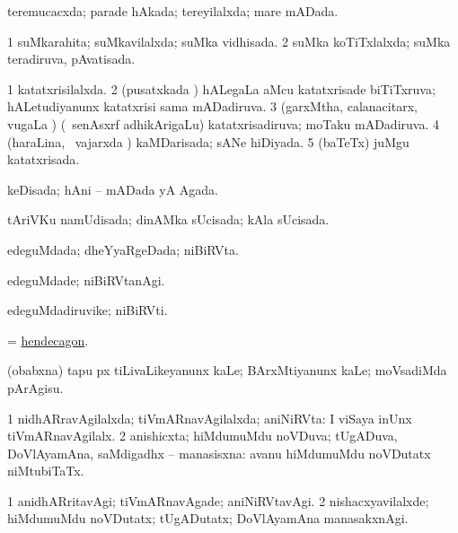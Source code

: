 \bentry
{} 
\gl{\gu}
\expl{}
\bmng
 teremucacxda; parade hAkada; tereyilalxda; mare mADada. 
\emng
\eentry

\bentry
{} 
\gl{\gu}
\expl{}
\bmng
\bnum
\num{1} suMkarahita; suMkavilalxda; suMka vidhisada. 
\num{2} suMka koTiTxlalxda; suMka teradiruva, pAvatisada. 
\enum
\emng
\eentry

\bentry
{} 
\gl{\gu}
\expl{}
\bmng
\bnum
\num{1} katatxrisilalxda. 
\num{2} (pusatxkada \vi) hALegaLa aMcu katatxrisade biTiTxruva; hALetudiyanunx katatxrisi sama mADadiruva. 
\num{3} (garxMtha, calanacitarx, \mo vugaLa \vi) (\kanmu\ senAsxrf adhikArigaLu) katatxrisadiruva; moTaku mADadiruva. 
\num{4} (haraLina, \kanmu\ vajarxda \vi) kaMDarisada; sANe hiDiyada. 
\num{5} (baTeTx) juMgu katatxrisada. 
\enum
\emng
\eentry

\bentry
{} 
\gl{\gu}
\expl{}
\bmng
keDisada; hAni -- mADada yA Agada. 
\emng
\eentry

\bentry
{} 
\gl{\gu}
\bmng
 tAriVKu namUdisada; dinAMka sUcisada; kAla sUcisada. 
\emng
\eentry

\bentry
{} 
\gl{\gu}
\expl{}
\bmng
 edeguMdada; dheYyaRgeDada; niBiRVta. 
\emng
\eentry

\bentry
{} 
\gl{\kirxvi}
\expl{}
\bmng
 edeguMdade; niBiRVtanAgi. 
\emng
\eentry

\bentry
{} 
\gl{\nA}
\expl{}
\bmng
 edeguMdadiruvike; niBiRVti. 
\emng
\eentry

\bentry
{} 
\gl{\nA}
\expl{}
\bmng
 = \hyperref{kandict_h.pdf}{H}{hendecagon}{hendecagon}. 
\emng
\eentry

\bentry
{} 
\gl{\sakirx}
\expl{}
\bmng
 (obabxna) tapu px tiLivaLikeyanunx kaLe; BArxMtiyanunx kaLe; moVsadiMda pArAgisu. 
\emng
\eentry

\bentry
{} 
\gl{\gu}
\expl{}
\bmng
\bnum
\num{1} nidhARravAgilalxda; tiVmARnavAgilalxda; aniNiRVta:  I viSaya inUnx tiVmARnavAgilalx. 
\num{2} anishicxta; hiMdumuMdu noVDuva; tUgADuva, DoVlAyamAna, saMdigadhx -- manasisxna:  avanu hiMdumuMdu noVDutatx niMtubiTaTx. 
\enum
\emng
\eentry

\bentry
{} 
\gl{\kirxvi}
\expl{}
\bmng
\bnum
\num{1} anidhARritavAgi; tiVmARnavAgade; aniNiRVtavAgi. 
\num{2} nishacxyavilalxde; hiMdumuMdu noVDutatx; tUgADutatx; DoVlAyamAna manasakxnAgi. 
\enum
\emng
\eentry

